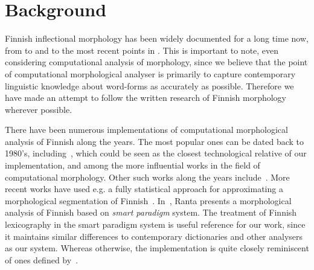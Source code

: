 \documentclass[a4paper,12pt]{article}
\begin{document}
\section{Background}
\label{sec:background}

Finnish inflectional morphology has been widely documented for a long time now,
from \citet{setala1920suomen} to \citet{hakulinen1968suomen} and
\citet{karlsson1982suomen} to the most recent points in \citet{visk}. This is
important to note, even considering computational analysis of morphology, since
we believe that the point of computational morphological analyser is primarily
to capture contemporary linguistic knowledge about word-forms as accurately as
possible.  Therefore we have made an attempt to follow the written research of
Finnish morphology wherever possible.

There have been numerous implementations of computational morphological
analysis of Finnish along the years. The most popular ones can be dated back to
1980's, including~\citet{koskenniemi1983twolevel}, which could be seen as the
closest technological relative of our implementation, and among the more
influential works in the field of computational morphology. Other such works
along the years include~\citet{holman1988finnmorf}.  More recent works have
used e.g. a fully statistical approach for approximating a morphological
segmentation of Finnish~\citep{creutz2005unsupervised}.
In~\citet{ranta2008predictable}, Ranta presents a morphological analysis of
Finnish based on \emph{smart paradigm} system. The treatment of Finnish
lexicography in the smart paradigm system is useful reference for our work,
since it maintains similar differences to contemporary dictionaries and other
analysers as our system. Whereas otherwise, the implementation is quite closely
reminiscent of ones defined
by~\citet{koskenniemi1983twolevel,beesley2003finite}.
\end{document}
